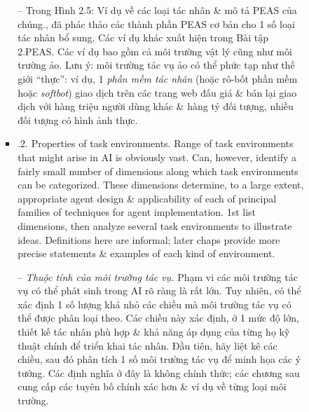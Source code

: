 \documentclass{article}
\begin{document}
\begin{itemize}
\begin{itemize}
\begin{itemize}
\begin{itemize}
				-- Trong {\sf Hình 2.5: Ví dụ về các loại tác nhân \& mô tả PEAS của chúng.}, đã phác thảo các thành phần PEAS cơ bản cho 1 số loại tác nhân bổ sung. Các ví dụ khác xuất hiện trong Bài tập 2.PEAS. Các ví dụ bao gồm cả môi trường vật lý cũng như môi trường ảo. Lưu ý: môi trường tác vụ ảo có thể phức tạp như thế giới ``thực'': ví dụ, 1 {\it phần mềm tác nhân} (hoặc rô-bốt phần mềm hoặc {\it softbot}) giao dịch trên các trang web đấu giá \& bán lại giao dịch với hàng triệu người dùng khác \& hàng tỷ đối tượng, nhiều đối tượng có hình ảnh thực.
				\item {.2. Properties of task environments.} Range of task environments that might arise in AI is obviously vast. Can, however, identify a fairly small number of dimensions along which task environments can be categorized. These dimensions determine, to a large extent, appropriate agent design \& applicability of each of principal families of techniques for agent implementation. 1st list dimensions, then analyze several task environments to illustrate ideas. Definitions here are informal; later chaps provide more precise statements \& examples of each kind of environment.

				-- {\it Thuộc tính của môi trường tác vụ.} Phạm vi các môi trường tác vụ có thể phát sinh trong AI rõ ràng là rất lớn. Tuy nhiên, có thể xác định 1 số lượng khá nhỏ các chiều mà môi trường tác vụ có thể được phân loại theo. Các chiều này xác định, ở 1 mức độ lớn, thiết kế tác nhân phù hợp \& khả năng áp dụng của từng họ kỹ thuật chính để triển khai tác nhân. Đầu tiên, hãy liệt kê các chiều, sau đó phân tích 1 số môi trường tác vụ để minh họa các ý tưởng. Các định nghĩa ở đây là không chính thức; các chương sau cung cấp các tuyên bố chính xác hơn \& ví dụ về từng loại môi trường.


\end{itemize}
\end{itemize}
\end{itemize}
\end{itemize}
\end{document}
